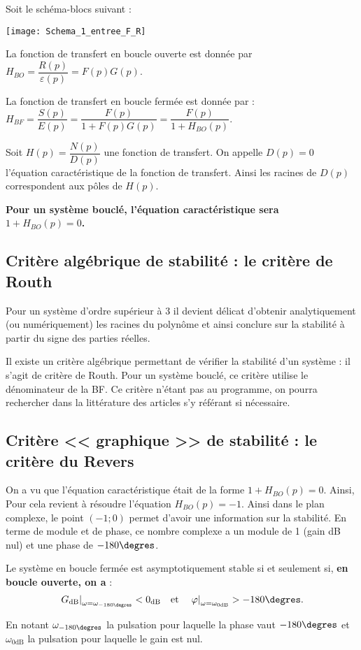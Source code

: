 Soit le schéma-blocs suivant : 

\begin{center}
\texttt{[image: Schema\_1\_entree\_F\_R]}
\end{center}

La fonction de transfert en boucle ouverte est donnée par $H_{BO}=\dfrac{R(p)}{\varepsilon(p)}=F(p)G(p)$. 

La fonction de transfert en boucle fermée est donnée par : $H_{BF}=\dfrac{S(p)}{E(p)}=\dfrac{F(p)}{1+F(p)G(p)}=\dfrac{F(p)}{1+H_{BO}(p)}$. 

\begin{defi}
Soit $H(p)=\dfrac{N(p)}{D(p)}$ une fonction de transfert. On appelle $D(p)=0$ l'équation caractéristique de la fonction de transfert. Ainsi les racines de $D(p)$ correspondent aux pôles de $H(p)$.
\end{defi}

\textbf{Pour un système bouclé, l'équation caractéristique sera $1+H_{BO}(p)=0$.}

\subsection{Critère algébrique de stabilité : le critère de Routh}
Pour un système d'ordre supérieur à 3 il devient délicat d'obtenir analytiquement (ou numériquement) les racines du polynôme et ainsi conclure sur la stabilité à partir du signe des parties réelles. 

Il existe un critère algébrique permettant de vérifier la stabilité d'un système : il s'agit de critère de Routh. Pour un système bouclé, ce critère utilise le dénominateur de la BF. Ce critère n'étant pas au programme, on pourra rechercher dans la littérature des articles s'y référant si nécessaire. 

\subsection{Critère << graphique >> de stabilité : le critère du Revers}
 On a vu que l'équation caractéristique était de la forme $1+H_{BO}(p)=0$. Ainsi, Pour cela revient à résoudre l'équation $H_{BO}(p)=-1$. Ainsi dans le plan complexe, le point $(-1;0)$ permet d'avoir une information sur la stabilité. En terme de module et de phase, ce nombre complexe a un module de 1 (gain dB nul) et une phase de $-180\degres$.
 
\begin{resultat}
Le système en boucle fermée est asymptotiquement stable si et seulement si, \textbf{en boucle ouverte, on a} :
$$
\left. G_{\text{dB}} \right|_{\omega=\omega_{-180\degres}}<0_{\text{dB}} 
\quad
\text{et}
\quad
\left. \varphi \right|_{\omega=\omega_{0\text{dB}}}>-180\degres.
$$

En notant $\omega_{-180\degres}$ la pulsation pour laquelle la phase vaut $-180\degres$ et $\omega_{0\text{dB}}$ la pulsation pour laquelle le gain est nul.
\end{resultat}
 

